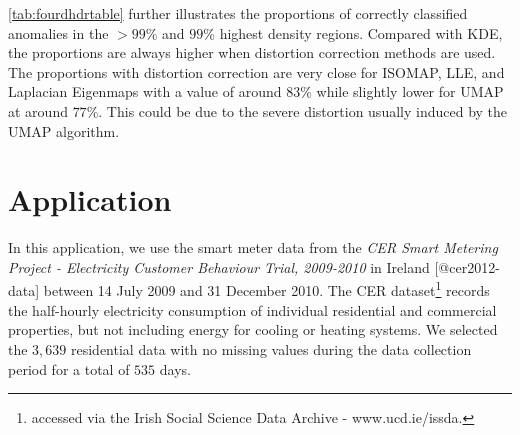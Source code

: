 \documentclass[
]{article}
\begin{document}
\begin{table}

\caption{\label{tab:fourdhdrtable}Proportion comparison of outliers in correct highest density regions in density estimation of four manifold learning embeddings for the 100-D data.}
\centering
{}
\end{table}

\autoref{tab:fourdhdrtable} further illustrates the proportions of
correctly classified anomalies in the \(>99\%\) and \(99\%\) highest
density regions. Compared with KDE, the proportions are always higher
when distortion correction methods are used. The proportions with
distortion correction are very close for ISOMAP, LLE, and Laplacian
Eigenmaps with a value of around \(83\%\) while slightly lower for UMAP
at around \(77\%\). This could be due to the severe distortion usually
induced by the UMAP algorithm.

\hypertarget{dckdeapplication}{%
\section{Application}\label{dckdeapplication}}

In this application, we use the smart meter data from the \emph{CER
Smart Metering Project - Electricity Customer Behaviour Trial,
2009-2010} in Ireland {[}@cer2012-data{]} between 14 July 2009 and 31
December 2010. The CER dataset\footnote{accessed via the Irish Social
  Science Data Archive - www.ucd.ie/issda.} records the half-hourly
electricity consumption of individual residential and commercial
properties, but not including energy for cooling or heating systems. We
selected the \(3,639\) residential data with no missing values during
the data collection period for a total of \(535\) days.
\end{document}
